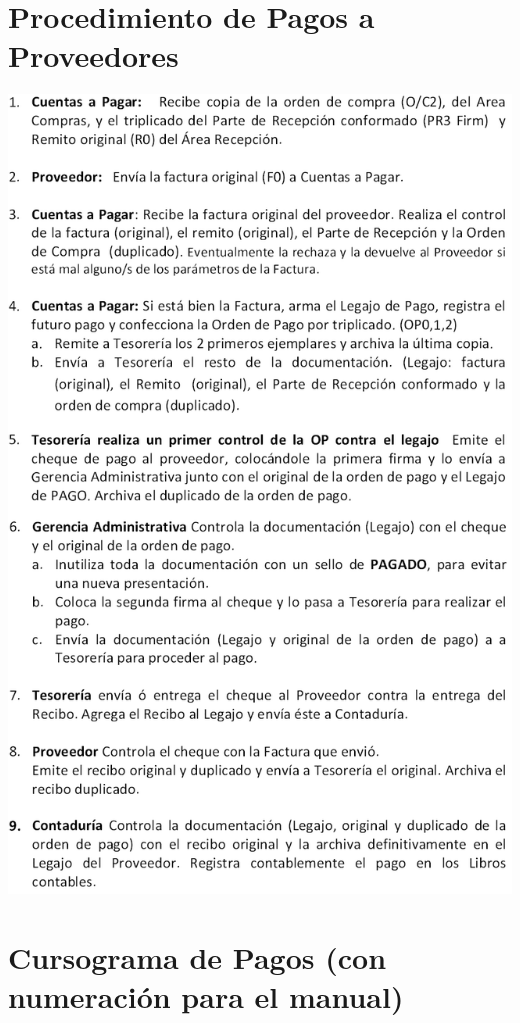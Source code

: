 \section{Procedimiento de Pagos a Proveedores}
\begin{center}
 \includegraphics[scale=0.7,keepaspectratio=true]{./Circuitos-Teoricos/Pago-a-Proveedores/Images/procedimiento-pago-a-proveedores.png}
\end{center}

\section{Cursograma de Pagos (con numeración para el manual)}
